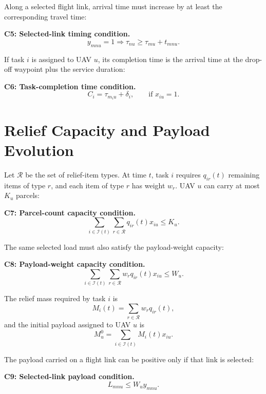 Along a selected flight link, arrival time must increase by at least the
corresponding travel time:

\noindent\textbf{C5: Selected-link timing condition.}
\begin{equation*}
y_{mnu}=1
\Rightarrow
\tau_{nu}
\geq
\tau_{mu}+t_{mnu}.
\end{equation*}

If task $i$ is assigned to UAV $u$, its completion time is the arrival time at
the drop-off waypoint plus the service duration:

\noindent\textbf{C6: Task-completion time condition.}
\begin{equation*}
C_i
=
\tau_{m_i u}+\delta_i,
\qquad
\text{if }x_{iu}=1.
\end{equation*}

\section{Relief Capacity and Payload Evolution}

Let $\mathcal{R}$ be the set of relief-item types. At time $t$, task $i$
requires $q_{ir}(t)$ remaining items of type $r$, and each item of type $r$
has weight $w_r$. UAV $u$ can carry at most $K_u$ parcels:

\noindent\textbf{C7: Parcel-count capacity condition.}
\begin{equation*}
\sum_{i\in\mathcal{I}(t)}
\sum_{r\in\mathcal{R}}
q_{ir}(t)x_{iu}
\leq
K_u.
\end{equation*}

The same selected load must also satisfy the payload-weight capacity:

\noindent\textbf{C8: Payload-weight capacity condition.}
\begin{equation*}
\sum_{i\in\mathcal{I}(t)}
\sum_{r\in\mathcal{R}}
w_r q_{ir}(t)x_{iu}
\leq
W_u.
\end{equation*}

The relief mass required by task $i$ is
\begin{equation}
M_i(t)
=
\sum_{r\in\mathcal{R}}
w_r q_{ir}(t),
\end{equation}
and the initial payload assigned to UAV $u$ is
\begin{equation}
M_u^0
=
\sum_{i\in\mathcal{I}(t)}
M_i(t)x_{iu}.
\end{equation}

The payload carried on a flight link can be positive only if that link is
selected:

\noindent\textbf{C9: Selected-link payload condition.}
\begin{equation*}
L_{mnu}
\leq
W_u y_{mnu}.
\end{equation*}

